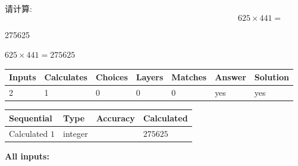 \documentclass{ctexart}
\begin{document}
  
 
请计算:
\begin{equation}
625  \times    %
441 = \nonumber
\end{equation}
 
 
 
\noindent{}
 
 

275625
 
 
\noindent{}
 
 

 
 
 
\noindent{}
 
 

$ %
625 \times  %
441=   %
275625$
 
 
\noindent{}
 
 

 
   
   
   
   
\noindent\begin{tabular}{|l|l|l|l|l|l|l|}
 \hline
Inputs & Calculates & Choices & Layers & Matches & Answer & Solution \\ \hline
 2  & 
 1  & 
 0
  & 
 0  & 
 0  & 
  yes & 
  yes 
  \\ \hline
 \end{tabular}
   
   
   
   
\noindent{}
   
   
  
  
\noindent\begin{tabular}{|l|l|l|l|}
\hline
 Sequential & Type & Accuracy & Calculated \\ 
\hline
 
 
  Calculated $  1 $ & integer &  & 
  $ 275625 $ 
 \\  \hline  
 \end{tabular}
   
   
   
   
\noindent\vspace{0.1in}\hspace{-0.08in} {\textbf{\Large{All inputs: }}}
   
\end{document}
